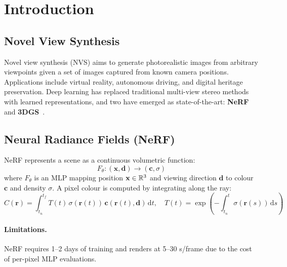 \section{Introduction}
\label{sec:introduction}

\subsection{Novel View Synthesis}

Novel view synthesis (NVS) aims to generate photorealistic images from arbitrary
viewpoints given a set of images captured from known camera positions.
Applications include virtual reality, autonomous driving, and digital heritage
preservation. Deep learning has replaced traditional multi-view stereo methods
with learned representations, and two have emerged as state-of-the-art:
\textbf{NeRF}~\cite{mildenhall2020nerf} and \textbf{3DGS}~\cite{kerbl2023gaussian}.

\subsection{Neural Radiance Fields (NeRF)}
\label{ssec:nerf}

NeRF represents a scene as a continuous volumetric function:
\begin{equation}
  F_\theta: (\mathbf{x}, \mathbf{d}) \longrightarrow (\mathbf{c}, \sigma)
\end{equation}
where $F_\theta$ is an MLP mapping position $\mathbf{x} \in \mathbb{R}^3$ and viewing
direction $\mathbf{d}$ to colour $\mathbf{c}$ and density $\sigma$. A pixel
colour is computed by integrating along the ray:
\begin{equation}
  \hat{C}(\mathbf{r}) = \int_{t_n}^{t_f} T(t)\,\sigma(\mathbf{r}(t))\,
    \mathbf{c}(\mathbf{r}(t),\mathbf{d})\,\mathrm{d}t, \quad
  T(t) = \exp\!\left(-\int_{t_n}^{t}\sigma(\mathbf{r}(s))\,\mathrm{d}s\right)
\end{equation}

\paragraph{Limitations.} NeRF requires 1--2 days of training and renders at
5--30 s/frame due to the cost of per-pixel MLP evaluations.

